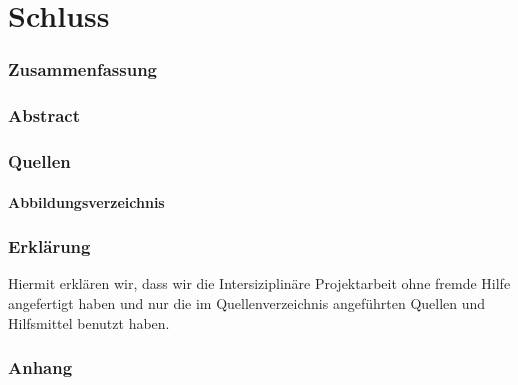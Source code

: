 \part{Schluss}
\section{Zusammenfassung}
\section{Abstract}
\section{Quellen}
\subsection{Abbildungsverzeichnis}
\section{Erklärung}
Hiermit erklären wir, dass wir die Intersiziplinäre Projektarbeit ohne fremde Hilfe angefertigt haben und nur die im Quellenverzeichnis angeführten Quellen und Hilfsmittel benutzt haben.
\section{Anhang}
